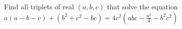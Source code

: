 Find all triplets of real $(a,b,c)$ that solve the equation $a(a-b-c)+(b^2+c^2-bc)=4c^2\left(abc-\frac{a^2}{4}-b^2c^2\right)$